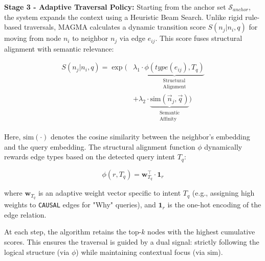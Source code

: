 \documentclass[11pt]{article}
\begin{document}
\noindent\textbf{Stage 3 - Adaptive Traversal Policy:}
Starting from the anchor set $\mathcal{S}_{anchor}$, the system expands the context using a Heuristic Beam Search. Unlike rigid rule-based traversals, MAGMA calculates a dynamic transition score $S(n_j | n_i, q)$ for moving from node $n_i$ to neighbor $n_j$ via edge $e_{ij}$. This score fuses structural alignment with semantic relevance:

\begin{equation}
\label{eq:beam_score}
\begin{split}
    S(n_j|n_i, q) = \exp \bigg( & \lambda_1 \cdot \underbrace{\phi(type(e_{ij}), T_q)}_{\substack{\text{Structural} \\ \text{Alignment}}} \\
    & + \lambda_2 \cdot \underbrace{\text{sim}(\vec{n}_j, \vec{q})}_{\substack{\text{Semantic} \\ \text{Affinity}}} \bigg)
\end{split}
\end{equation}

Here, $\text{sim}(\cdot)$ denotes the cosine similarity between the neighbor's embedding and the query embedding. The structural alignment function $\phi$ dynamically rewards edge types based on the detected query intent $T_q$:

\begin{equation}
    \phi(r, T_q) = \mathbf{w}_{T_q}^\top \cdot \mathbf{1}_r
\end{equation}

where $\mathbf{w}_{T_q}$ is an adaptive weight vector specific to intent $T_q$ (e.g., assigning high weights to \texttt{CAUSAL} edges for "Why" queries), and $\mathbf{1}_r$ is the one-hot encoding of the edge relation. 

At each step, the algorithm retains the top-$k$ nodes with the highest cumulative scores. This ensures the traversal is guided by a dual signal: strictly following the logical structure (via $\phi$) while maintaining contextual focus (via $\text{sim}$).
\end{document}
